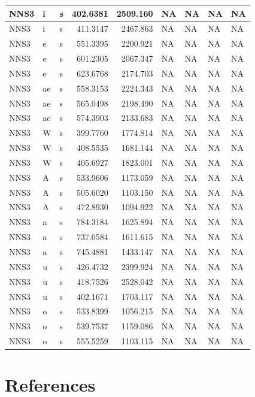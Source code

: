 \documentclass[man, fleqn, noextraspace]{apa6}
\begin{document}
\begin{tabular}{l|l|l|r|r|l|l|l|l}
\hline
NNS3 & i & s & 402.6381 & 2509.160 & NA & NA & NA & NA\\
\hline
NNS3 & i & s & 411.3147 & 2467.863 & NA & NA & NA & NA\\
\hline
NNS3 & e & s & 551.3395 & 2200.921 & NA & NA & NA & NA\\
\hline
NNS3 & e & s & 601.2305 & 2067.347 & NA & NA & NA & NA\\
\hline
NNS3 & e & s & 623.6768 & 2174.703 & NA & NA & NA & NA\\
\hline
NNS3 & ae & s & 558.3153 & 2224.343 & NA & NA & NA & NA\\
\hline
NNS3 & ae & s & 565.0498 & 2198.490 & NA & NA & NA & NA\\
\hline
NNS3 & ae & s & 574.3903 & 2133.683 & NA & NA & NA & NA\\
\hline
NNS3 & W & s & 399.7760 & 1774.814 & NA & NA & NA & NA\\
\hline
NNS3 & W & s & 408.5535 & 1681.144 & NA & NA & NA & NA\\
\hline
NNS3 & W & s & 405.6927 & 1823.001 & NA & NA & NA & NA\\
\hline
NNS3 & A & s & 533.9606 & 1173.059 & NA & NA & NA & NA\\
\hline
NNS3 & A & s & 505.6020 & 1103.150 & NA & NA & NA & NA\\
\hline
NNS3 & A & s & 472.8930 & 1094.922 & NA & NA & NA & NA\\
\hline
NNS3 & a & s & 784.3184 & 1625.894 & NA & NA & NA & NA\\
\hline
NNS3 & a & s & 737.0584 & 1611.615 & NA & NA & NA & NA\\
\hline
NNS3 & a & s & 745.4881 & 1433.147 & NA & NA & NA & NA\\
\hline
NNS3 & u & s & 426.4732 & 2399.924 & NA & NA & NA & NA\\
\hline
NNS3 & u & s & 418.7526 & 2528.042 & NA & NA & NA & NA\\
\hline
NNS3 & u & s & 402.1671 & 1703.117 & NA & NA & NA & NA\\
\hline
NNS3 & o & s & 533.8399 & 1056.215 & NA & NA & NA & NA\\
\hline
NNS3 & o & s & 539.7537 & 1159.086 & NA & NA & NA & NA\\
\hline
NNS3 & o & s & 555.5259 & 1103.115 & NA & NA & NA & NA\\
\hline
\end{tabular}

\section{\texorpdfstring{\textbf{References}}{References}}\label{references}
\end{document}
